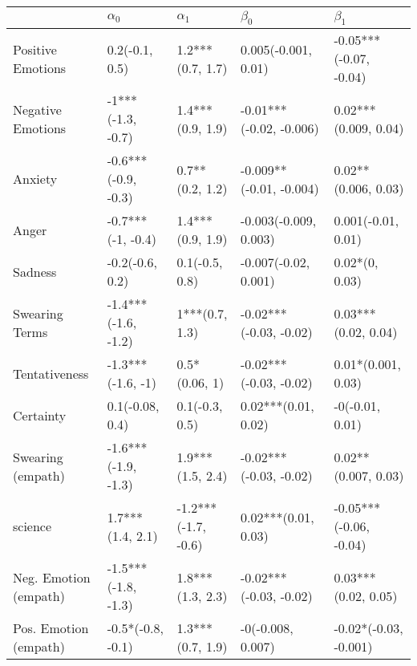 \begin{tabular}{lllll}
\toprule
{} &           $\alpha_0$ &           $\alpha_1$ &                $\beta_0$ &               $\beta_1$ \\
\midrule
Positive Emotions     &       0.2(-0.1, 0.5) &     1.2***(0.7, 1.7) &      0.005(-0.001, 0.01) &  -0.05***(-0.07, -0.04) \\
Negative Emotions     &    -1***(-1.3, -0.7) &     1.4***(0.9, 1.9) &  -0.01***(-0.02, -0.006) &    0.02***(0.009, 0.04) \\
Anxiety               &  -0.6***(-0.9, -0.3) &      0.7**(0.2, 1.2) &  -0.009**(-0.01, -0.004) &     0.02**(0.006, 0.03) \\
Anger                 &    -0.7***(-1, -0.4) &     1.4***(0.9, 1.9) &    -0.003(-0.009, 0.003) &      0.001(-0.01, 0.01) \\
Sadness               &      -0.2(-0.6, 0.2) &       0.1(-0.5, 0.8) &     -0.007(-0.02, 0.001) &          0.02*(0, 0.03) \\
Swearing Terms        &  -1.4***(-1.6, -1.2) &       1***(0.7, 1.3) &   -0.02***(-0.03, -0.02) &     0.03***(0.02, 0.04) \\
Tentativeness         &    -1.3***(-1.6, -1) &        0.5*(0.06, 1) &   -0.02***(-0.03, -0.02) &      0.01*(0.001, 0.03) \\
Certainty             &      0.1(-0.08, 0.4) &       0.1(-0.3, 0.5) &      0.02***(0.01, 0.02) &         -0(-0.01, 0.01) \\
Swearing (empath)     &  -1.6***(-1.9, -1.3) &     1.9***(1.5, 2.4) &   -0.02***(-0.03, -0.02) &     0.02**(0.007, 0.03) \\
science               &     1.7***(1.4, 2.1) &  -1.2***(-1.7, -0.6) &      0.02***(0.01, 0.03) &  -0.05***(-0.06, -0.04) \\
Neg. Emotion (empath) &  -1.5***(-1.8, -1.3) &     1.8***(1.3, 2.3) &   -0.02***(-0.03, -0.02) &     0.03***(0.02, 0.05) \\
Pos. Emotion (empath) &    -0.5*(-0.8, -0.1) &     1.3***(0.7, 1.9) &        -0(-0.008, 0.007) &   -0.02*(-0.03, -0.001) \\
\bottomrule
\end{tabular}
